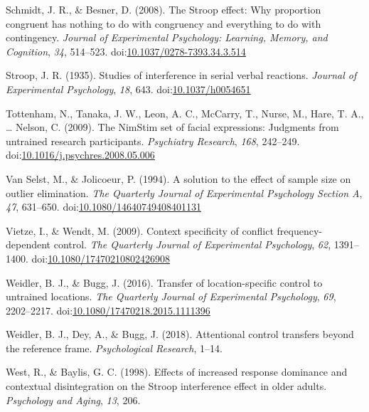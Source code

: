 \documentclass[english,,man,floatsintext]{apa6}
\begin{document}
\leavevmode\hypertarget{ref-schmidt_stroop_2008}{}%
Schmidt, J. R., \& Besner, D. (2008). The Stroop effect: Why proportion congruent has nothing to do with congruency and everything to do with contingency. \emph{Journal of Experimental Psychology: Learning, Memory, and Cognition}, \emph{34}, 514--523. doi:\href{https://doi.org/10.1037/0278-7393.34.3.514}{10.1037/0278-7393.34.3.514}

\leavevmode\hypertarget{ref-stroop_studies_1935}{}%
Stroop, J. R. (1935). Studies of interference in serial verbal reactions. \emph{Journal of Experimental Psychology}, \emph{18}, 643. doi:\href{https://doi.org/10.1037/h0054651}{10.1037/h0054651}

\leavevmode\hypertarget{ref-tottenham_nimstim_2009}{}%
Tottenham, N., Tanaka, J. W., Leon, A. C., McCarry, T., Nurse, M., Hare, T. A., \ldots{} Nelson, C. (2009). The NimStim set of facial expressions: Judgments from untrained research participants. \emph{Psychiatry Research}, \emph{168}, 242--249. doi:\href{https://doi.org/10.1016/j.psychres.2008.05.006}{10.1016/j.psychres.2008.05.006}

\leavevmode\hypertarget{ref-van_selst_solution_1994}{}%
Van Selst, M., \& Jolicoeur, P. (1994). A solution to the effect of sample size on outlier elimination. \emph{The Quarterly Journal of Experimental Psychology Section A}, \emph{47}, 631--650. doi:\href{https://doi.org/10.1080/14640749408401131}{10.1080/14640749408401131}

\leavevmode\hypertarget{ref-vietze_context_2009}{}%
Vietze, I., \& Wendt, M. (2009). Context specificity of conflict frequency-dependent control. \emph{The Quarterly Journal of Experimental Psychology}, \emph{62}, 1391--1400. doi:\href{https://doi.org/10.1080/17470210802426908}{10.1080/17470210802426908}

\leavevmode\hypertarget{ref-weidler_transfer_2016}{}%
Weidler, B. J., \& Bugg, J. (2016). Transfer of location-specific control to untrained locations. \emph{The Quarterly Journal of Experimental Psychology}, \emph{69}, 2202--2217. doi:\href{https://doi.org/10.1080/17470218.2015.1111396}{10.1080/17470218.2015.1111396}

\leavevmode\hypertarget{ref-weidler_attentional_2018}{}%
Weidler, B. J., Dey, A., \& Bugg, J. (2018). Attentional control transfers beyond the reference frame. \emph{Psychological Research}, 1--14.

\leavevmode\hypertarget{ref-west_effects_1998}{}%
West, R., \& Baylis, G. C. (1998). Effects of increased response dominance and contextual disintegration on the Stroop interference effect in older adults. \emph{Psychology and Aging}, \emph{13}, 206.

\endgroup
\end{document}
